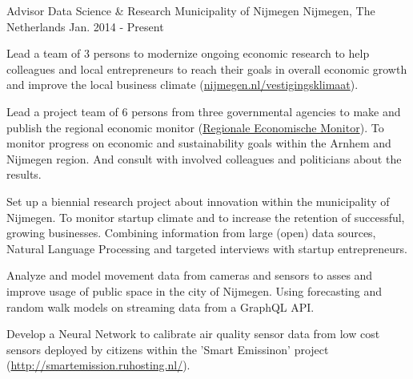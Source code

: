 

\begin{cventries}

  \cventry
    {Advisor Data Science \& Research} %
    {Municipality of Nijmegen} %
    {Nijmegen, The Netherlands} %
    {Jan. 2014 - Present} %
    {
      \begin{cvitems} %
        \item {Lead a team of 3 persons to modernize ongoing economic research to help colleagues and local entrepreneurs to reach their goals in overall economic growth and improve the local business climate (\href{nijmegen.nl/vestigingsklimaat}{nijmegen.nl/vestigingsklimaat}).}
        \item {Lead a project team of 6 persons from three governmental agencies to make and publish the regional economic monitor (\href{https://public.tableau.com/views/REM_1/Index?:embed=y&:display_count=yes&:showVizHome=no}{Regionale Economische Monitor}). To monitor progress on economic and sustainability goals within the Arnhem and Nijmegen region. And consult with involved colleagues and politicians about the results.}
        \item {Set up a biennial research project about innovation within the municipality of Nijmegen. To monitor startup climate and to increase the retention of successful, growing businesses. Combining information from large (open) data sources, Natural Language Processing and targeted interviews with startup entrepreneurs.}
        \item {Analyze and model movement data from cameras and sensors to asses and improve usage of public space in the city of Nijmegen. Using forecasting and random walk models on streaming data from a GraphQL API.}
        \item {Develop a Neural Network to calibrate air quality sensor data from low cost sensors deployed by citizens within the 'Smart Emissinon' project (\href{http://smartemission.ruhosting.nl/}{http://smartemission.ruhosting.nl/}).}
    \end{cvitems}
    }


\end{cventries}

